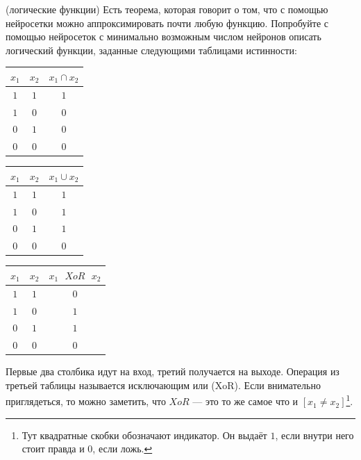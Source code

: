 \documentclass[12pt, a4paper, oneside]{article}
\theoremstyle{plain} %
\theoremstyle{definition}
\begin{document}
\begin{problem}{(логические функции)}
Есть теорема, которая говорит о том, что с помощью нейросетки можно аппроксимировать почти любую функцию. Попробуйте с помощью нейросеток с минимально возможным числом нейронов описать логический функции, заданные следующими таблицами истинности:

\begin{center}
\begin{minipage}{0.3\linewidth} 
\begin{tabular}{c|c|c}
	$x_1$ & $x_2$ & $x_1 \cap x_2$ \\
	\hline 
	$1$ & $1$ & $1$ \\
	\hline 
	$1$ & $0$ & $0$ \\
	\hline 
	$0$ & $1$ & $0$ \\
	\hline 
	$0$ & $0$ & $0$ \\
\end{tabular}
\end{minipage}
\hfill
\begin{minipage}{0.3\linewidth}
		\begin{tabular}{c|c|c}
		$x_1$ & $x_2$ & $x_1 \cup x_2$ \\
		\hline 
		$1$ & $1$ & $1$ \\
		\hline 
		$1$ & $0$ & $1$ \\
		\hline 
		$0$ & $1$ & $1$ \\
		\hline 
		$0$ & $0$ & $0$ \\
	\end{tabular}
\end{minipage}
\hfill
\begin{minipage}{0.3\linewidth}
		\begin{tabular}{c|c|c}
		$x_1$ & $x_2$ & $x_1 \mbox{ } XoR \mbox{ } x_2$ \\
		\hline 
		$1$ & $1$ & $0$ \\
		\hline 
		$1$ & $0$ & $1$ \\
		\hline 
		$0$ & $1$ & $1$ \\
		\hline 
		$0$ & $0$ & $0$ \\
	\end{tabular}
\end{minipage}
\end{center}

Первые два столбика идут на вход, третий получается на выходе.  Операция из третьей таблицы называется исключающим или (XoR). Если внимательно приглядеться, то можно заметить, что $XoR$ --- это то же самое что и $[x_1 \ne x_2]$\footnote{Тут квадратные скобки обозначают индикатор. Он выдаёт $1$, если внутри него стоит правда и $0$, если ложь.}. 
\end{problem}
\end{document}
